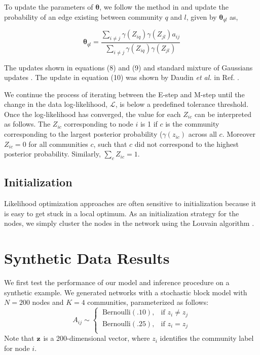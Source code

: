 To update the parameters of ${\boldsymbol \theta}$, we follow the method in \cite{dudin} and update the probability of an edge existing between community $q$ and $l$, given by ${\boldsymbol \theta}_{ql}$ as,

\begin{equation}
{\boldsymbol \theta}_{ql}=\frac{\sum_{i\ne j} \gamma(Z_{iq})\gamma(Z_{jl})a_{ij}}{\sum_{i \ne j}\gamma(Z_{iq})\gamma(Z_{jl})}
\end{equation}

The updates shown in equations (8) and (9) and standard mixture of Gaussians updates \cite{EMIntro}. The update in equation (10) was shown by Daudin \emph{et al.} in Ref. \cite{dudin}. 

We continue the process of iterating between the E-step and M-step until the change in the data log-likelihood, ${\mathcal L}$, is below a predefined tolerance threshold. Once the log-likelihood has converged, the value for each $Z_{ic}$ can be interpreted as follows. The $Z_{ic}$ corresponding to node $i$ is 1 if $c$ is the community corresponding to the largest posterior probability ($\gamma(z_{ic})$ across all $c$. Moreover $Z_{ic}=0$ for all communities $c$, such that $c$ did not correspond to the highest posterior probability. Similarly, $\sum_{c}Z_{ic}=1$. 

\subsection{Initialization}
Likelihood optimization approaches are often sensitive to initialization because it is easy to get stuck in a local optimum. As an initialization strategy for the nodes, we simply cluster the nodes in the network using the Louvain algorithm \cite{blondel}.  

\section{Synthetic Data Results}
We first test the performance of our model and inference procedure on a synthetic example. We generated networks with a stochastic block model with $N=200$ nodes and $K=4$ communities, parameterized as follows: 
\begin{equation}
A_{ij} \sim 
\begin{cases}
~\text{Bernoulli}(.10), & \mbox{if } z_{i} \ne z_{j}\\
~\text{Bernoulli}(.25), & \mbox{if } z_{i} = z_{j}\\
\end{cases}
\end{equation}
Note that ${\bf z}$ is a 200-dimensional vector, where $z_{i}$ identifies the community label for node $i$. 

